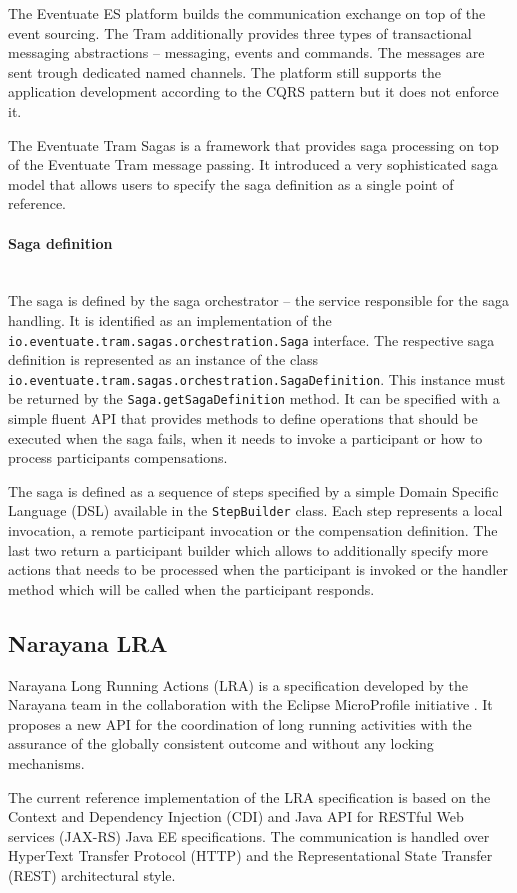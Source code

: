 \documentclass[oneside,
  digital, %
  table,   %
  lof,     %
  lot,     %
]{fithesis3}
\newcommand{\newlinepar}[1]{\paragraph{#1}\needspace{4\baselineskip}\mbox{}\\}
\begin{document}
The Eventuate ES platform builds the communication exchange on top of the event sourcing. The Tram additionally provides three types of transactional messaging abstractions -- messaging, events and commands. The messages are sent trough dedicated named channels. The platform still supports the application development according to the CQRS pattern but it does not enforce it.

The Eventuate Tram Sagas is a framework that provides saga processing on top of the Eventuate Tram message passing. It introduced a very sophisticated saga model that allows users to specify the saga definition as a single point of reference. 

\newlinepar{Saga definition}

The saga is defined by the saga orchestrator -- the service responsible for the saga handling. It is identified as an implementation of the \texttt{io.eventuate.tram.sagas.orchestration.Saga} interface. The respective saga definition is represented as an instance of the class \texttt{io.eventuate.tram.sagas.orchestration.SagaDefinition}. This instance must be returned by the \texttt{Saga.getSagaDefinition} method. It can be specified with a simple fluent API that provides methods to define operations that should be executed when the saga fails, when it needs to invoke a participant or how to process participants compensations. 

The saga is defined as a sequence of steps specified by a simple Domain Specific Language (DSL) available in the \texttt{StepBuilder} class. Each step represents a local invocation, a remote participant invocation or the compensation definition. The last two return a participant builder which allows to additionally specify more actions that needs to be processed when the participant is invoked or the handler method which will be called when the participant responds.

\subsection{Narayana LRA}

Narayana Long Running Actions (LRA) is a specification developed by the Narayana team in the collaboration with the Eclipse MicroProfile initiative \cite{saga-impl-comp}. It proposes a new API for the coordination of long running activities with the assurance of the globally consistent outcome and without any locking mechanisms.

The current reference implementation of the LRA specification is based on the Context and Dependency Injection (CDI) and Java API for RESTful Web services (JAX-RS) Java EE specifications. The communication is handled over HyperText Transfer Protocol (HTTP) and the Representational State Transfer (REST) architectural style.
\end{document}
